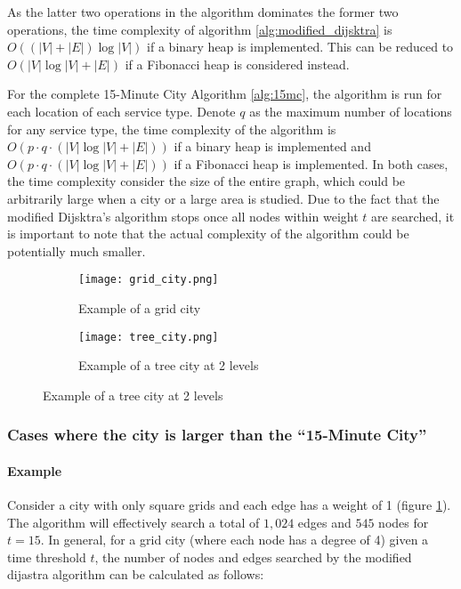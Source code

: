 As the latter two operations in the algorithm dominates the former two operations, the time complexity of algorithm \ref{alg:modified_dijsktra} is $O((|V|+|E|)\log |V|)$ if a binary heap is implemented. This can be reduced to $O(|V|\log |V|+|E|)$ if a Fibonacci heap is considered instead.

For the complete 15-Minute City Algorithm \ref{alg:15mc}, the algorithm is run for each location of each service type. Denote $q$ as the maximum number of locations for any service type, the time complexity of the algorithm is $O(p\cdot q\cdot(|V|\log |V|+|E|))$ if a binary heap is implemented and $O(p\cdot q\cdot(|V|\log |V|+|E|))$ if a Fibonacci heap is implemented. In both cases, the time complexity consider the size of the entire graph, which could be arbitrarily large when a city or a large area is studied. Due to the fact that the modified Dijsktra's algorithm stops once all nodes within weight $t$ are searched, it is important to note that the actual complexity of the algorithm could be potentially much smaller.

\begin{figure}[H]
    \centering
    \begin{subfigure}{0.5\textwidth}
        \centering
        \texttt{[image: grid\_city.png]}
        \caption{Example of a grid city}
        \label{fig:grid_city}
    \end{subfigure}\hfill
    \begin{subfigure}{0.5\textwidth}
        \centering
        \texttt{[image: tree\_city.png]}
        \caption{Example of a tree city at 2 levels}
        \label{fig:tree_city}
    \end{subfigure}
\end{figure}

\subsubsection{Cases where the city is larger than the ``15-Minute City''}

\paragraph{Example}

Consider a city with only square grids and each edge has a weight of 1 (figure \ref{fig:grid_city}). The algorithm will effectively search a total of $1,024$ edges and $545$ nodes for $t=15$. In general, for a grid city (where each node has a degree of 4) given a time threshold $t$, the number of nodes and edges searched by the modified dijastra algorithm can be calculated as follows:

